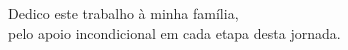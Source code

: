 %

\begin{dedicatoria}
    \vspace*{\fill} %

    \begin{flushright}
        \begin{minipage}{10cm}
            \begin{OnehalfSpace}
                Dedico este trabalho à minha família,\\
                pelo apoio incondicional em cada etapa desta jornada.
            \end{OnehalfSpace}
        \end{minipage}
    \end{flushright}
\end{dedicatoria}

